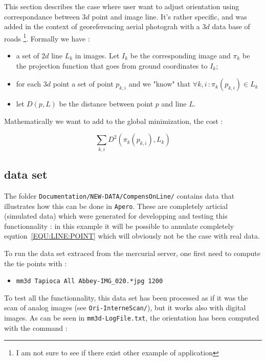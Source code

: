 This section describes the case where user want to adjust orientation using correspondance between $3d$ point
and image line. It's rather specific, and was added in the context of  georeferencing aerial photograh with a $3d$ 
data base of roads \footnote{I am not sure to see if there exist other example of application}. Formally we have :

\begin{itemize}
    \item a set of $2d$ line $L_k$ in images. Let $I_k$ be the corresponding image and $\pi_k$ be the projection
         function that goes from ground coordinates to $I_k$;
    \item for each $3d$ point a set of point $p_{k,i}$ and we "know" that $\forall k,i \, : \pi_k (p_{k,i}) \in L_k $
    \item let $D(p,L)$ be the distance between point $p$ and line $L$.
\end{itemize}

Mathematically we want to add to the global minimization, the cost :

\begin{equation}
    \sum_{k,i} D^2 ( \pi_k(p_{k,i}),L_k) \label{EQU:LINE:POINT}
\end{equation}



\subsection{data set}

The folder {\tt Documentation/NEW-DATA/CompensOnLine/} contains  data that illustrates how this can be done in 
{\tt Apero}. These are completely articial (simulated data) which were generated for developping and testing this functionnality : in this example it will be possible to annulate completely eqution~\ref{EQU:LINE:POINT} which will obviously not
be the case with real data.  

To run the data set extraced from the mercurial server, one first need to compute the tie points with :

\begin{itemize}
   \item {\tt mm3d Tapioca All Abbey-IMG\_020.*jpg 1200}
\end{itemize}

To test all the functionnality, this data set has been processed as if it was the scan of analog images
(see {\tt Ori-InterneScan/}), but it works also with digital images. As can be seen in {\tt mm3d-LogFile.txt},
the orientation has been computed with the command :

